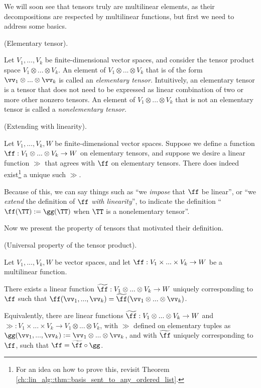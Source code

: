 We will soon see that tensors truly are multilinear elements, as their decompositions are respected by multilinear functions, but first we need to address some basics.

\begin{defn}
    (Elementary tensor). 
    
    Let $V_1, ..., V_k$ be finite-dimensional vector spaces, and consider the tensor product space $V_1 \otimes ... \otimes V_k$. An element of $V_1 \otimes ... \otimes V_k$ that is of the form $\vv_1 \otimes ... \otimes \vv_k$ is called an \textit{elementary tensor}. Intuitively, an elementary tensor is a tensor that does not need to be expressed as linear combination of two or more other nonzero tensors. An element of $V_1 \otimes ... \otimes V_k$ that is not an elementary tensor is called a \textit{nonelementary tensor}.
\end{defn}

\begin{remark}
    (Extending with linearity).

    Let $V_1, ..., V_k, W$ be finite-dimensional vector spaces. Suppose we define a function $\ff:V_1 \otimes ... \otimes V_k \rightarrow W$ on elementary tensors, and suppose we desire a linear function $\gg$ that agrees with $\ff$ on elementary tensors. There does indeed exist\footnote{For an idea on how to prove this, revisit Theorem \ref{ch::lin_alg::thm::basis_sent_to_any_ordered_list}.} a unique such $\gg$.
    
    Because of this, we can say things such as ``we \textit{impose} that $\ff$ be linear'', or ``we \textit{extend} the definition of $\ff$ \textit{with linearity}'', to indicate the definition ``$\ff(\TT) := \gg(\TT)$ when $\TT$ is a nonelementary tensor''.
\end{remark}

Now we present the property of tensors that motivated their definition.

\begin{theorem}
\label{ch::lin_alg::thm::universal_prop_tensor_prod}
    (Universal property of the tensor product).

    Let $V_1, ..., V_k, W$ be vector spaces, and let $\ff:V_1 \times ... \times V_k \rightarrow W$ be a multilinear function. 
    
    There exists a linear function $\widetilde{\ff}:V_1 \otimes ... \otimes V_k \rightarrow W$ uniquely corresponding to $\ff$ such that $\ff(\vv_1, ..., \vv_k) = \widetilde{\ff}(\vv_1 \otimes ... \otimes \vv_k)$.

    Equivalently, there are linear functions $\widetilde{\ff}:V_1 \otimes ... \otimes V_k \rightarrow W$ and $\gg:V_1 \times ... \times V_k \rightarrow V_1 \otimes ... \otimes V_k$, with $\gg$ defined on elementary tuples as $\gg(\vv_1, ..., \vv_k) := \vv_1 \otimes ... \otimes \vv_k$, and with $\widetilde{\ff}$ uniquely corresponding to $\ff$, such that $\ff = \widetilde{\ff} \circ \gg$.
\end{theorem}

